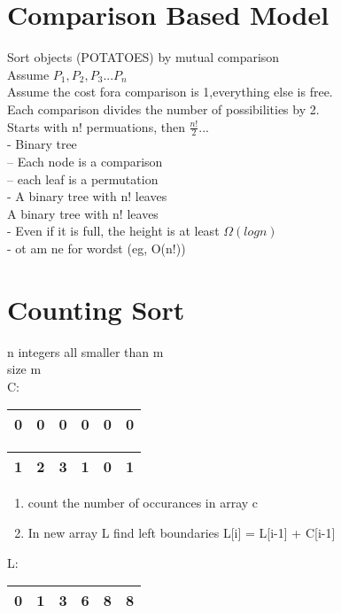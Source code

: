 \documentclass[12pt]{article}
\begin{document}
	\section*{Comparison Based Model}
	Sort objects (POTATOES) by mutual comparison\\
	
	Assume $P_1, P_2, P_3 ... P_n$\\
	Assume the cost fora comparison is 1,everything else is free.\\
	
	Each comparison divides the number of possibilities by 2.\\
	Starts with n! permuations, then $\frac{n!}{2} ...$\\
	- Binary tree\\
	-- Each node is a comparison\\
	-- each leaf is a permutation\\
	- A binary tree with n! leaves\\
	
	A binary tree with n! leaves\\
	- Even if it is full, the height is at least $\Omega(logn)$\\
	- ot am ne for wordst (eg, O(n!))\\
	
	\section*{Counting Sort}
	n integers all smaller than m\\
	size m\\
	C:\\
	\begin{tabular}{| c | c | c | c | c | c |}
		\hline
		0 & 0 & 0 & 0 & 0 & 0 \\ \hline	
	\end{tabular}
	\begin{tabular}{| c | c | c | c | c | c |}
		\hline
		1 & 2 & 3 & 1 & 0 & 1 \\ \hline	
	\end{tabular}
	
	\begin{enumerate}
		\item count the number of occurances in array c
		\item In new array L find left boundaries L[i] = L[i-1] + C[i-1]
	\end{enumerate}
	
	L:
	\begin{tabular}{| c | c | c | c | c | c |}
		\hline
		0 & 1 & 3 & 6 & 8 & 8 \\ \hline	
	\end{tabular}
\end{document}
